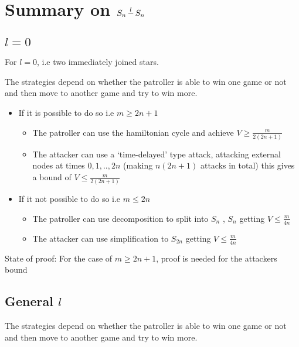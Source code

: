 \documentclass[a4paper,10pt]{article}
\theoremstyle{definition}
\theoremstyle{definition}
\theoremstyle{remark}
\theoremstyle{definition}
\newcommand{\tightoverset}[2]{%
  \mathop{#2}\limits^{\vbox to -.1ex{\kern-0.75ex\hbox{$#1$}\vss}}}
\begin{document}
\section[]{Summary on $S_{n} \tightoverset{\scalebox{0.8}{$l$}}{-} S_{n}$}

\subsection[]{$l=0$}
For $l=0$, i.e two immediately joined stars.

The strategies depend on whether the patroller is able to win one game or not and then move to another game and try to win more.

\begin{itemize}
\item If it is possible to do so i.e $m \geq 2n+1$
  \begin{itemize}
  \item The patroller can use the hamiltonian cycle and achieve $V \geq \frac{m}{2(2n+1)}$
  
  \item The attacker can use a `time-delayed' type attack, attacking external nodes at times $0,1,..,2n$ (making $n(2n+1)$ attacks in total) this gives a bound of $V \leq \frac{m}{2(2n+1)}$
  \end{itemize}

\item If it not possible to do so i.e $m \leq 2n$
 \begin{itemize}
 \item The patroller can use decomposition to split into $S_{n}$ , $S_{n}$ getting $V \leq \frac{m}{4n}$
 
 \item The attacker can use simplification to $S_{2n}$ getting $V \leq \frac{m}{4n}$
 \end{itemize}
\end{itemize}

State of proof: For the case of $m \geq 2n+1$, proof is needed for the attackers bound
\subsection[]{General $l$}

The strategies depend on whether the patroller is able to win one game or not and then move to another game and try to win more.
\end{document}
